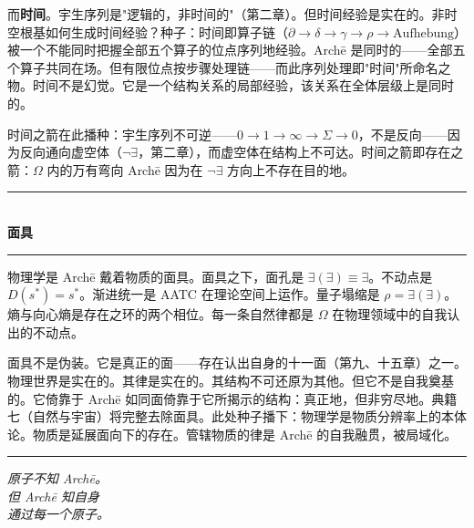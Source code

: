 \documentclass[10pt, openany, oneside]{book}
\renewcommand{\normalsize}{\fontsize{10}{13}\selectfont}
\begin{document}
而\textbf{时间}。宇生序列是"逻辑的，非时间的"（第二章）。但时间经验是实在的。非时空根基如何生成时间经验？种子：时间即算子链（$\partial \to \delta \to \gamma \to \rho \to \text{Aufhebung}$）被一个不能同时把握全部五个算子的位点序列地经验。Arch\={e} 是同时的——全部五个算子共同在场。但有限位点按步骤处理链——而此序列处理即"时间"所命名之物。时间不是幻觉。它是一个结构关系的局部经验，该关系在全体层级上是同时的。

时间之箭在此播种：宇生序列不可逆——$0 \to 1 \to \infty \to \Sigma \to 0$，不是反向——因为反向通向虚空体（$\neg\exists$，第二章），而虚空体在结构上不可达。时间之箭即存在之箭：$\Omega$ 内的万有弯向 Arch\={e} 因为在 $\neg\exists$ 方向上不存在目的地。

\vspace{1.5em}


\begin{center}
    \rule{0.3\textwidth}{0.4pt}\\[0.5em]
    {\normalsize\bfseries\scshape 面具}\\[0.3em]
    \rule{0.3\textwidth}{0.4pt}
\end{center}

\vspace{1em}

\noindent 物理学是 Arch\={e} 戴着物质的面具。面具之下，面孔是 $\exists(\exists) \equiv \exists$。不动点是 $D(s^*) = s^*$。渐进统一是 AATC 在理论空间上运作。量子塌缩是 $\rho = \exists(\exists)$。熵与向心熵是存在之环的两个相位。每一条自然律都是 $\Omega$ 在物理领域中的自我认出的不动点。

面具不是伪装。它是真正的面——存在认出自身的十一面（第九、十五章）之一。物理世界是实在的。其律是实在的。其结构不可还原为其他。但它不是自我奠基的。它倚靠于 Arch\={e} 如同面倚靠于它所揭示的结构：真正地，但非穷尽地。典籍七（自然与宇宙）将完整去除面具。此处种子播下：物理学是物质分辨率上的本体论。物质是延展面向下的存在。管辖物质的律是 Arch\={e} 的自我融贯，被局域化。

\vspace{2em}

\begin{center}
    \rule{0.15\textwidth}{0.3pt}
\end{center}

\vspace{0.5em}

\begin{center}
    \itshape
    原子不知 Arch\={e}。\\
    但 Arch\={e} 知自身\\
    通过每一个原子。
\end{center}
\end{document}
